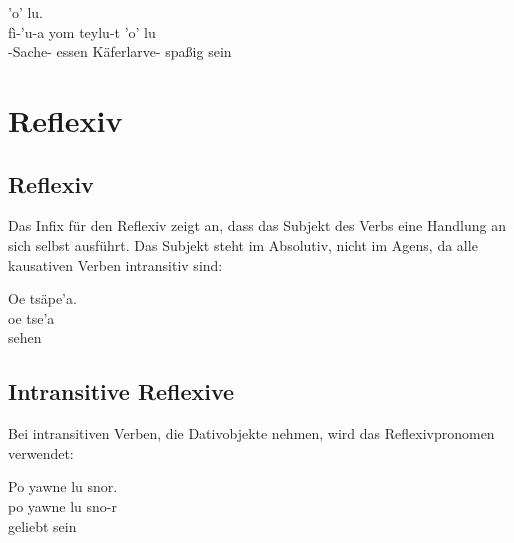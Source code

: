 \begin{interlin}
	\glll \Npawl{}   'o' lu. \\
	fì-'u-a yom teylu-t 'o' lu \\
	-Sache- essen Käferlarve- spaßig sein \\
\end{interlin}

\section{Reflexiv}
\subsection{Reflexiv} Das Infix für den Reflexiv  zeigt an, dass das Subjekt des Verbs eine Handlung an sich selbst ausführt. Das Subjekt steht im Absolutiv, nicht im Agens, da alle kausativen Verben intransitiv sind: 

\begin{interlin}
	\glll \Npawl{}Oe tsäpe'a. \\
	oe tse'a \\
	 sehen \\
\end{interlin}

\subsection{Intransitive Reflexive} Bei intransitiven Verben, die Dativobjekte nehmen, wird das Reflexivpronomen  verwendet:

\begin{interlin}
	\glll \Npawl{}Po yawne lu snor. \\
	po yawne lu sno-r \\
	 geliebt sein  \\
\end{interlin}

